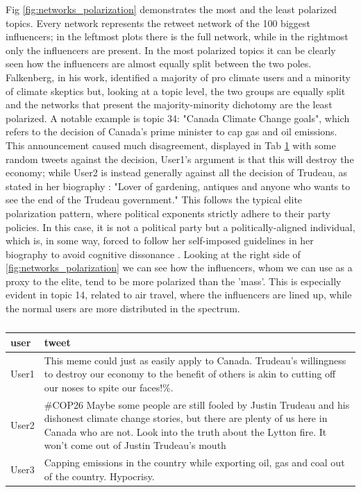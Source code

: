 Fig \ref{fig:networks_polarization} demonstrates the most and the least polarized topics. Every network represents the retweet network of the 100 biggest influencers; in the leftmost plots there is the full network, while in the rightmost only the influencers are present. In the most polarized topics it can be clearly seen how the influencers are almost equally split between the two poles. 
Falkenberg, in his work, identified a majority of pro climate users and a minority of climate skeptics but, looking at a topic level, the two groups are equally split and the networks that present the majority-minority dichotomy are the least polarized. A notable example is topic 34: "Canada Climate Change goals", which refers to the decision of Canada’s prime minister to cap gas and oil emissions. 
This announcement caused much disagreement, displayed in Tab \ref{tab:canadatweets} with some random tweets against the decision, User1’s argument is that this will destroy the economy; while User2 is instead generally against all the decision of Trudeau, as stated in her biography : "Lover of gardening, antiques and anyone who wants to see the end of the Trudeau government." This follows the typical elite polarization pattern, where political exponents strictly adhere to their party policies. In this case, it is not a political party but a politically-aligned individual, which is, in some way, forced to follow her self-imposed guidelines in her biography to avoid cognitive dissonance  \cite{Festinger_dissonance_57}. Looking at the right side of \ref{fig:networks_polarization} we can see how the influencers, whom we can use as a proxy to the elite, tend to be more polarized than the ’mass’. This is especially evident in topic 14, related to air travel, where the influencers are lined up, while the normal users are more distributed in the spectrum.


\begin{table}[]
\centering
\begin{tabular}{|p{1in}|p{4in}|}\hline
\textbf{user} & \textbf{tweet} \\ \hline
User1     & This meme could just as easily apply to Canada. Trudeau’s willingness to destroy our economy to the benefit of others is akin to cutting off our noses to spite our faces!\%. \\ \hline
User2        & \#COP26 Maybe some people are still fooled by Justin Trudeau and his dishonest climate change stories, but there are plenty of us here in Canada who are not. Look into the truth about the Lytton fire. It won't come out of Justin Trudeau's mouth \\ \hline
User3          & Capping emissions in the country while exporting oil, gas and coal out of the country. Hypocrisy.
 \\ \hline
\end{tabular}
\caption{}
\label{tab:canadatweets}
\end{table}




